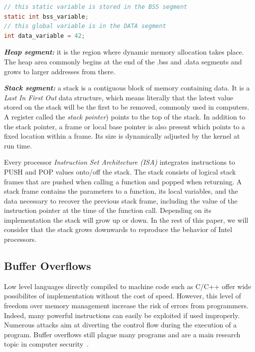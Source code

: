 \documentclass[10pt,twocolumn]{article}
\begin{document}
\begin{lstlisting}[aboveskip=\bigskipamount,belowskip=\medskipamount,caption=Variable
location in memory,language=C] 
// this static variable is stored in the BSS segment
static int bss_variable;
// this global variable is in the DATA segment
int data_variable = 42; 
\end{lstlisting}

\textbf{\textit{Heap segment:}} it is the region where dynamic memory allocation
takes place. The heap area commonly begins at the end of the .bss and .data
segments and grows to larger addresses from there.

\textit{\textbf{Stack segment:}} a stack is a contiguous block of memory
containing data. It is a \textit{Last In First Out} data structure, which means
literally that the latest value stored on the stack will be the first to be
removed, commonly used
in computers. A register called the \textit{stack pointer}) points to
the top of the stack. In addition to the stack pointer, a frame or local base
pointer is also present which points to a fixed location within a frame. Its
size is dynamically adjusted by the kernel at run time.

Every processor \textit{Instruction Set Architecture (ISA)} integrates
instructions to PUSH and POP values onto/off the stack. The stack consists of
logical stack frames that are pushed when calling a function and popped when
returning. A stack frame contains the parameters to a function, its local
variables, and the data necessary to recover the previous stack frame,
including the value of the instruction pointer at the time of the function
call. Depending on its implementation the stack will grow up or down. In the
rest of this paper, we will consider that the stack grows downwards to
reproduce the behavior of Intel processors.

\subsection{Buffer Overflows}

Low level languages directly compiled to machine code such as C/C++ offer wide
possibilites of implementation without the cost of speed. However, this level
of freedom over memory management increase the risk of errors from programmers.
Indeed, many powerful instructions can easily be exploited if used improperly.
Numerous attacks aim at diverting the control flow during the execution of a
program. Buffer overflows still plague many programs and are a main research
topic in computer
security~\cite{DBLP:journals/iee/MouzaraniSZ16,DBLP:journals/iee/PadmanabhuniT16,DBLP:conf/ant/LeonB16}.
\end{document}

